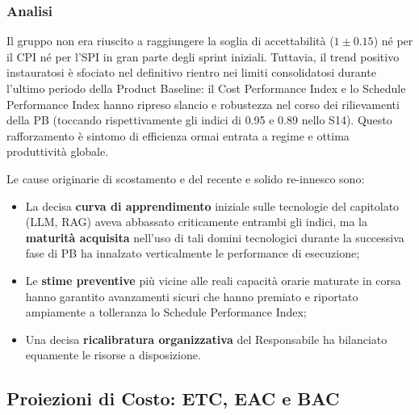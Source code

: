 \documentclass[a4paper,11pt,oneside]{scrartcl}
\begin{document}
\subsubsection*{Analisi}

Il gruppo non era riuscito a raggiungere la soglia di accettabilità ($1 \pm 0.15$) né per il CPI né per l'SPI in gran parte degli sprint iniziali. Tuttavia, il trend positivo instauratosi è sfociato nel definitivo rientro nei limiti consolidatosi durante l'ultimo periodo della Product Baseline: il Cost Performance Index e lo Schedule Performance Index hanno ripreso slancio e robustezza nel corso dei rilievamenti della PB (toccando rispettivamente gli indici di 0.95 e 0.89 nello S14). Questo rafforzamento è sintomo di efficienza ormai entrata a regime e ottima produttività globale.

Le cause originarie di scostamento e del recente e solido re-innesco sono:
\begin{itemize}
    \item La decisa \textbf{curva di apprendimento} iniziale sulle tecnologie del capitolato (LLM{\scriptsize{}}, RAG{\scriptsize{}}) aveva abbassato criticamente entrambi gli indici, ma la \textbf{maturità acquisita} nell'uso di tali domini tecnologici durante la successiva fase di PB ha innalzato verticalmente le performance di esecuzione;
    \item Le \textbf{stime preventive} più vicine alle reali capacità orarie maturate in corsa hanno garantito avanzamenti sicuri che hanno premiato e riportato ampiamente a tolleranza lo Schedule Performance Index;
    \item Una decisa \textbf{ricalibratura organizzativa} del Responsabile ha bilanciato equamente le risorse a disposizione.
\end{itemize}

\subsection{Proiezioni di Costo: ETC, EAC e BAC}
\end{document}
